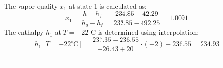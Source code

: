 The vapor quality \( x_1 \) at state 1 is calculated as:  
\[
x_1 = \frac{h - h_f}{h_g - h_f} = \frac{234.85 - 42.29}{232.85 - 492.25} = 1.0091
\]  
The enthalpy \( h_1 \) at \( T = -22^\circ\text{C} \) is determined using interpolation:  
\[
h_1[T = -22^\circ\text{C}] = \frac{237.35 - 236.55}{-26.43 + 20} \cdot (-2) + 236.55 = 234.93
\]

---